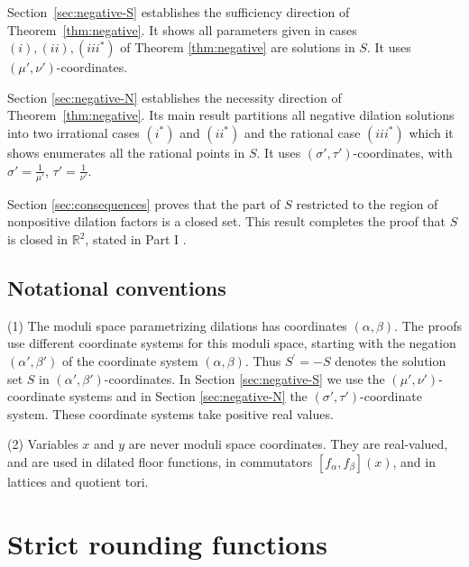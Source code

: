 \documentclass[11pt, letterpaper, reqno]{amsart}
\theoremstyle{definition}
\theoremstyle{remark}
\numberwithin{equation}{section}
\newcommand{\RR}{\ensuremath{\mathbb{R}}}
\newcommand{\uu}{{\mu'}}
\newcommand{\vv}{{\nu'}}
\newcommand{\alphap}{{\alpha'}}
\newcommand{\betap}{{\beta'}}
\newcommand{\tbetap}{{\sigma'}}
\newcommand{\trhop}{{\tau'}}
\newcommand{\pS}{{S}^{'}}
\begin{document}
Section~\ref{sec:negative-S}  establishes the sufficiency direction of
Theorem~\ref{thm:negative}. 
It shows all parameters given in cases $(i), (ii), (iii^{\ast})$
of Theorem \ref{thm:negative} are solutions in $S$. 
It uses $(\uu, \vv)$-coordinates.

 Section \ref{sec:negative-N} establishes the necessity direction of
Theorem~\ref{thm:negative}. Its main result  
partitions all negative dilation solutions 
into  two irrational cases $(i^{\ast})$ and $(ii^{\ast})$  and the rational 
case $(iii^{\ast})$ which it shows 
enumerates all the rational points in $S$.
It uses $(\tbetap, \trhop)$-coordinates,
with $\tbetap= \frac{1}{\uu}$, $\trhop=\frac{1}{{\vv}}$. 

Section \ref{sec:consequences}  proves that the part of 
$S$  restricted to the region of nonpositive dilation factors is a closed set.
This result  completes the proof that $S$ is closed in  $\RR^2$,  stated in Part I \cite[Theorem 1.4]{LagR:2018a}. 


%

\subsection{Notational conventions} 
\label{subsec:notation}
(1) The moduli space parametrizing  dilations 
 has  coordinates $(\alpha, \beta)$.
 The proofs use different coordinate systems for this moduli space, starting with 
 the negation $(\alphap, \betap)$
of the  coordinate system $(\alpha, \beta)$. Thus $\pS= -S$ denotes the solution set $S$ in $(\alphap, \betap)$-coordinates.
In Section \ref{sec:negative-S} we use the $(\uu, \vv)$-coordinate systems
and in Section \ref{sec:negative-N} the
$(\tbetap, \trhop)$-coordinate system. 
These  coordinate systems take  positive real values.

(2) Variables  $x$ and $y$ are never moduli space coordinates.   
They are real-valued, and  are used  in   
 dilated floor functions, in commutators $[f_{\alpha}, f_{\beta}](x)$,
 and  in  lattices and quotient tori. 




%
%
\section{Strict rounding functions}
\label{sec:rounding-S}
\end{document}
